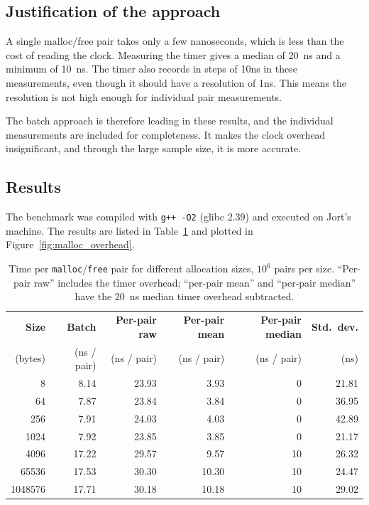 \documentclass[a4paper,11pt]{article}
\begin{document}
\subsection*{Justification of the approach}

A single malloc/free pair takes only a few nanoseconds,
which is less than the cost of reading the clock. Measuring the timer 
gives a median of 20~ns and a minimum of 10~ns.
The timer also records in steps of 10ns in these measurements, even though
it should have a resolution of 1ns. This means the resolution is not high
enough for individual pair measurements.

The batch approach is therefore leading in these results, and the individual
measurements are included for completeness. It makes the clock overhead insignificant,
and through the large sample size, it is more accurate.

\subsection*{Results}

The benchmark was compiled with \texttt{g++ -O2} (glibc 2.39) and executed
on Jort's machine. The results are listed in Table~\ref{tab:malloc_overhead}
and plotted in Figure~\ref{fig:malloc_overhead}.

\begin{table}[h]
    \centering
    \small
    \begin{tabular}{rrrrrr}
        \hline
        \textbf{Size} & \textbf{Batch} & \textbf{Per-pair raw} & \textbf{Per-pair mean} & \textbf{Per-pair median} & \textbf{Std.\ dev.} \\
        (bytes) & (ns / pair) & (ns / pair) & (ns / pair) & (ns / pair) & (ns) \\ \hline
        8       &  8.14 & 23.93 &  3.93 &  0 & 21.81 \\
        64      &  7.87 & 23.84 &  3.84 &  0 & 36.95 \\
        256     &  7.91 & 24.03 &  4.03 &  0 & 42.89 \\
        1024    &  7.92 & 23.85 &  3.85 &  0 & 21.17 \\
        4096    & 17.22 & 29.57 &  9.57 & 10 & 26.32 \\
        65536   & 17.53 & 30.30 & 10.30 & 10 & 24.47 \\
        1048576 & 17.71 & 30.18 & 10.18 & 10 & 29.02 \\
        \hline
    \end{tabular}
    \caption{Time per \texttt{malloc}/\texttt{free} pair for different allocation sizes, $10^6$ pairs per size. ``Per-pair raw'' includes the timer overhead; ``per-pair mean'' and ``per-pair median'' have the 20~ns median timer overhead subtracted.}
    \label{tab:malloc_overhead}
\end{table}
\end{document}
